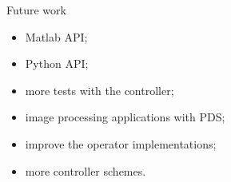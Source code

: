 \documentclass[hyperref,handout,compress,9pt,mathserif]{beamer}
\begin{document}
\begin{frame}{Future work}
\begin{itemize}
\item Matlab API;
\item Python API;
\item more tests with the controller;
\item image processing applications with PDS;
\item improve the operator implementations;
\item more controller schemes. 
\end{itemize}



\end{frame}

%
%
%
%
\end{document}
